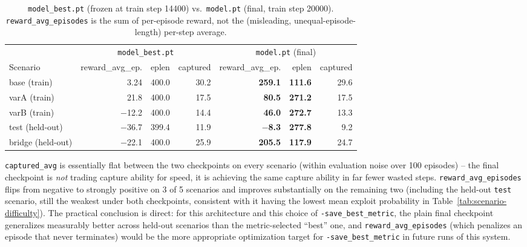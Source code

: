 \documentclass[11pt]{article}
\newcommand{\code}[1]{\texttt{#1}}
\begin{document}
\begin{table}[H]
\centering
\caption{\code{model\_best.pt} (frozen at train step 14400) vs.\ \code{model.pt}
(final, train step 20000). \code{reward\_avg\_episodes} is the sum of per-episode
reward, not the (misleading, unequal-episode-length) per-step average.}
\label{tab:eval-comparison}
\begin{tabular}{lrrrrrr}
\toprule
& \multicolumn{3}{c}{\code{model\_best.pt}} & \multicolumn{3}{c}{\code{model.pt} (final)} \\
\cmidrule(lr){2-4} \cmidrule(lr){5-7}
Scenario & reward\_avg\_ep. & eplen & captured & reward\_avg\_ep. & eplen & captured \\
\midrule
base (train)    & 3.24   & 400.0 & 30.2 & \textbf{259.1} & \textbf{111.6} & 29.6 \\
varA (train)    & 21.8   & 400.0 & 17.5 & \textbf{80.5}  & \textbf{271.2} & 17.5 \\
varB (train)    & $-$12.2 & 400.0 & 14.4 & \textbf{46.0}  & \textbf{272.7} & 13.3 \\
test (held-out) & $-$36.7 & 399.4 & 11.9 & \textbf{$-$8.3} & \textbf{277.8} & 9.2 \\
bridge (held-out) & $-$22.1 & 400.0 & 25.9 & \textbf{205.5} & \textbf{117.9} & 24.7 \\
\bottomrule
\end{tabular}
\end{table}

\code{captured\_avg} is essentially flat between the two checkpoints on every
scenario (within evaluation noise over 100 episodes) -- the final checkpoint is
\emph{not} trading capture ability for speed, it is achieving the same capture
ability in far fewer wasted steps. \code{reward\_avg\_episodes} flips from negative
to strongly positive on 3 of 5 scenarios and improves substantially on the remaining
two (including the held-out \code{test} scenario, still the weakest under both
checkpoints, consistent with it having the lowest mean exploit probability in
Table~\ref{tab:scenario-difficulty}). The practical conclusion is direct: for this
architecture and this choice of \code{-save\_best\_metric}, the plain final
checkpoint generalizes measurably better across held-out scenarios than the
metric-selected ``best'' one, and \code{reward\_avg\_episodes} (which penalizes an
episode that never terminates) would be the more appropriate optimization target for
\code{-save\_best\_metric} in future runs of this system.
\end{document}

